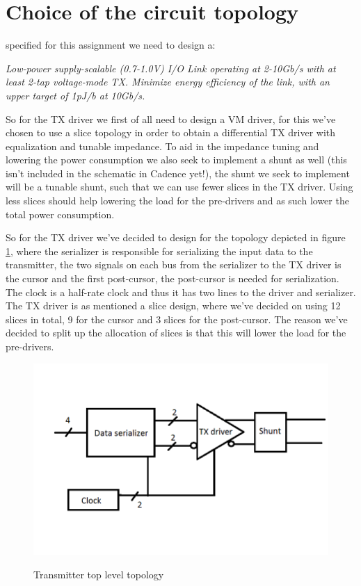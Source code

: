 \section{Choice of the circuit topology}

 specified for this assignment we need to design a:

\textit{Low-power supply-scalable (0.7-1.0V) I/O Link operating at 2-10Gb/s with at
least 2-tap voltage-mode TX. Minimize energy efficiency of the link, with an upper target
of 1pJ/b at 10Gb/s. }

So for the TX driver we first of all need to design a VM driver, for this we've chosen to use a slice topology in order to obtain a differential TX driver with equalization and tunable impedance. To aid in the impedance tuning and lowering the power consumption we also seek to implement a shunt as well (this isn't included in the schematic in Cadence yet!), the shunt we seek to implement will be a tunable shunt, such that we can use fewer slices in the TX driver. Using less slices should help lowering the load for the pre-drivers and as such lower the total power consumption.

So for the TX driver we've decided to design for the topology depicted in figure \ref{fig:topology}, where the serializer is responsible for serializing the input data to the transmitter, the two signals on each bus from the serializer to the TX driver is the cursor and the first post-cursor, the post-cursor is needed for serialization. The clock is a half-rate clock and thus it has two lines to the driver and serializer. The TX driver is as mentioned a slice design, where we've decided on using 12 slices in total, 9 for the cursor and 3 slices for the post-cursor. The reason we've decided to split up the allocation of slices is that this will lower the load for the pre-drivers.

\begin{figure}[H]
  \centering
  {\includegraphics[scale=0.55]{img/Topology.png}}
  \caption{Transmitter top level topology}
  \label{fig:topology}
\end{figure}

